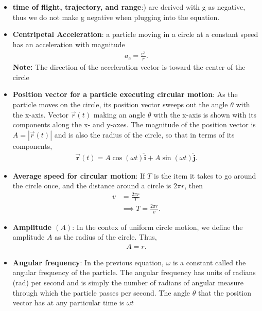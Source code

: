 \documentclass{report}
\begin{document}
\begin{itemize}
            \item \textbf{time of flight, trajectory, and range}:) are derived with g as negative, thus we do not make g negative when plugging into the equation. 
            \item \textbf{Centripetal Acceleration}: a particle moving in a circle at a constant speed has an acceleration with magnitude
                \begin{align*}
                    a_{c} = \frac{v^{2}}{r}
                .\end{align*}
                \textbf{Note:} The direction of the acceleration vector is toward the center of the circle
            \item \textbf{Position vector for a particle executing circular motion}:
                As the particle moves on the circle, its position vector sweeps out the angle $\theta$ with the x-axis. Vector $\vec{r}(t)$ making an angle $\theta$ with the x-axis is shown with its components along the x- and y-axes. The magnitude of the position vector is $A=|\vec{r}(t)|$ and is also the radius of the circle, so that in terms of its components,
                \begin{align*}
                    \vec{\mathbf{r}}(t) = A\cos(\omega t)\hat{\mathbf{i}} + A\sin(\omega t)\hat{\mathbf{j}}
                .\end{align*}
            \item \textbf{Average speed for circular motion}: If $T$ is the item it takes to go around the circle once, and the distance around a circle is $2\pi r$, then 
                \begin{align*}
                    v &= \frac{2\pi r}{T} \\
                      &\implies T = \frac{2\pi r}{v}
                .\end{align*}
            \item \textbf{Amplitude $(A)$}: In the contex of uniform circle motion, we define the amplitude $A$ as the radius of the circle. Thus,
                \begin{align*}
                    A = r
                .\end{align*}
            \item \textbf{Angular frequency}: In the previous equation, $\omega$ is a constant called the angular frequency of the particle.
                \bigbreak \noindent 
                The angular frequency has units of radians (rad) per second and is simply the number of radians of angular measure through which the particle passes per second. The angle  $\theta$ that the position vector has at any particular time is  $\omega t$

\end{itemize}
\end{document}
